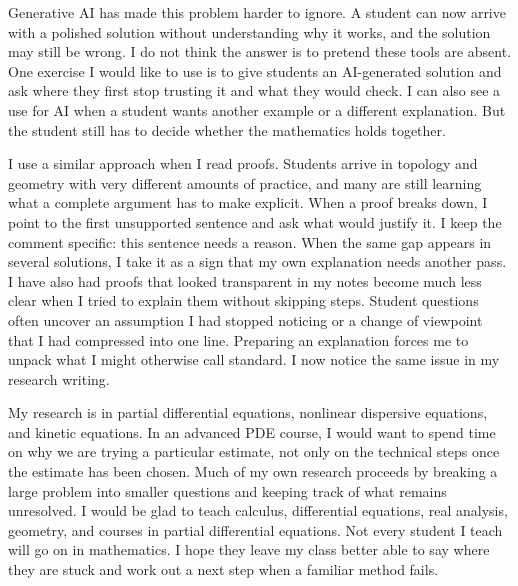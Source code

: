 \documentclass[11pt,reqno]{amsart}
\begin{document}
\newpage

Generative AI has made this problem harder to ignore. A student can now arrive
with a polished solution without understanding why it works, and the solution
may still be wrong. I do not think the answer is to pretend these tools are
absent. One exercise I would like to use is to give students an AI-generated
solution and ask where they first stop trusting it and what they would check.
I can also see a use for AI when a student wants another example or a different
explanation. But the student still has to decide whether the mathematics holds
together.

I use a similar approach when I read proofs. Students arrive in topology and
geometry with very different amounts of practice, and many are still learning
what a complete argument has to make explicit. When a proof breaks down, I
point to the first unsupported sentence and ask what would justify it. I keep
the comment specific: this sentence needs a reason. When the same gap appears
in several solutions, I take it as a sign that my own explanation needs
another pass. I have also had proofs that looked transparent in my notes
become much less clear when I tried to explain them without skipping steps.
Student questions often uncover an assumption I had stopped noticing or a
change of viewpoint that I had compressed into one line. Preparing an
explanation forces me to unpack what I might otherwise call standard. I now
notice the same issue in my research writing.

My research is in partial differential equations, nonlinear dispersive
equations, and kinetic equations. In an advanced PDE course, I would want to
spend time on why we are trying a particular estimate, not only on the
technical steps once the estimate has been chosen. Much of my own research
proceeds by breaking a large problem into smaller questions and keeping track
of what remains unresolved. I would be glad to teach calculus, differential
equations, real analysis, geometry, and courses in partial differential
equations. Not every student I teach will go on in mathematics. I hope they
leave my class better able to say where they are stuck and work out a next
step when a familiar method fails.
\end{document}
